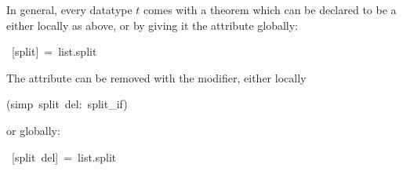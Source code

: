 \begin{isabelle}
\begin{isamarkuptext}
In general, every datatype $t$ comes with a theorem
 which can be declared to be a  either
locally as above, or by giving it the  attribute globally:%
\end{isamarkuptext}%
~[split]~=~list.split%
\begin{isamarkuptext}%
\noindent
The  attribute can be removed with the  modifier,
either locally%
\end{isamarkuptext}%
(simp~split~del:~split\_if)%
\begin{isamarkuptext}%
\noindent
or globally:%
\end{isamarkuptext}%
~[split~del]~=~list.split\isanewline
\end{isabelle}%
